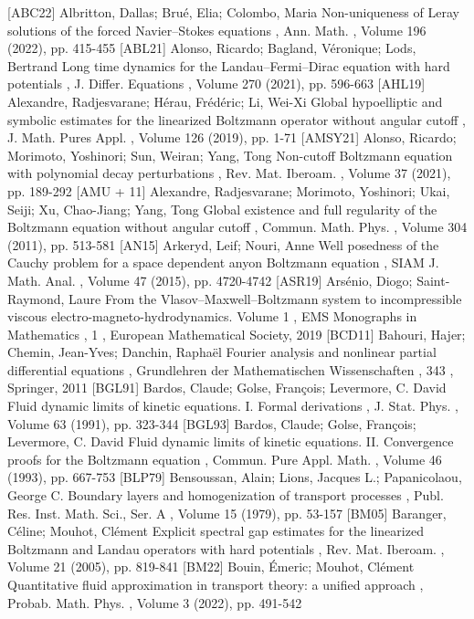  [ABC22] Albritton, Dallas; Brué, Elia; Colombo, Maria Non-uniqueness of Leray solutions of the forced Navier–Stokes equations , Ann. Math. , Volume 196 (2022), pp. 415-455
 [ABL21] Alonso, Ricardo; Bagland, Véronique; Lods, Bertrand Long time dynamics for the Landau–Fermi–Dirac equation with hard potentials , J. Differ. Equations , Volume 270 (2021), pp. 596-663
 [AHL19] Alexandre, Radjesvarane; Hérau, Frédéric; Li, Wei-Xi Global hypoelliptic and symbolic estimates for the linearized Boltzmann operator without angular cutoff , J. Math. Pures Appl. , Volume 126 (2019), pp. 1-71
 [AMSY21] Alonso, Ricardo; Morimoto, Yoshinori; Sun, Weiran; Yang, Tong Non-cutoff Boltzmann equation with polynomial decay perturbations , Rev. Mat. Iberoam. , Volume 37 (2021), pp. 189-292
 [AMU + 11] Alexandre, Radjesvarane; Morimoto, Yoshinori; Ukai, Seiji; Xu, Chao-Jiang; Yang, Tong Global existence and full regularity of the Boltzmann equation without angular cutoff , Commun. Math. Phys. , Volume 304 (2011), pp. 513-581
 [AN15] Arkeryd, Leif; Nouri, Anne Well posedness of the Cauchy problem for a space dependent anyon Boltzmann equation , SIAM J. Math. Anal. , Volume 47 (2015), pp. 4720-4742
 [ASR19] Arsénio, Diogo; Saint-Raymond, Laure From the Vlasov–Maxwell–Boltzmann system to incompressible viscous electro-magneto-hydrodynamics. Volume 1 , EMS Monographs in Mathematics , 1 , European Mathematical Society, 2019
 [BCD11] Bahouri, Hajer; Chemin, Jean-Yves; Danchin, Raphaël Fourier analysis and nonlinear partial differential equations , Grundlehren der Mathematischen Wissenschaften , 343 , Springer, 2011
 [BGL91] Bardos, Claude; Golse, François; Levermore, C. David Fluid dynamic limits of kinetic equations. I. Formal derivations , J. Stat. Phys. , Volume 63 (1991), pp. 323-344
 [BGL93] Bardos, Claude; Golse, François; Levermore, C. David Fluid dynamic limits of kinetic equations. II. Convergence proofs for the Boltzmann equation , Commun. Pure Appl. Math. , Volume 46 (1993), pp. 667-753
 [BLP79] Bensoussan, Alain; Lions, Jacques L.; Papanicolaou, George C. Boundary layers and homogenization of transport processes , Publ. Res. Inst. Math. Sci., Ser. A , Volume 15 (1979), pp. 53-157
 [BM05] Baranger, Céline; Mouhot, Clément Explicit spectral gap estimates for the linearized Boltzmann and Landau operators with hard potentials , Rev. Mat. Iberoam. , Volume 21 (2005), pp. 819-841
 [BM22] Bouin, Émeric; Mouhot, Clément Quantitative fluid approximation in transport theory: a unified approach , Probab. Math. Phys. , Volume 3 (2022), pp. 491-542
